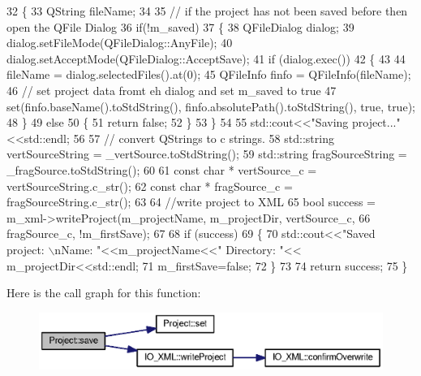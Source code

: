 \begin{DoxyCode}
32 \{
33   QString fileName;
34 
35   \textcolor{comment}{// if the project has not been saved before then open the QFile Dialog}
36   \textcolor{keywordflow}{if}(!m_saved)
37   \{
38     QFileDialog dialog;
39     dialog.setFileMode(QFileDialog::AnyFile);
40     dialog.setAcceptMode(QFileDialog::AcceptSave);
41     \textcolor{keywordflow}{if} (dialog.exec())
42     \{
43 
44       fileName = dialog.selectedFiles().at(0);
45       QFileInfo finfo = QFileInfo(fileName);
46       \textcolor{comment}{// set project data fromt eh dialog and set m\_saved to true}
47       set(finfo.baseName().toStdString(), finfo.absolutePath().toStdString(), \textcolor{keyword}{true}, \textcolor{keyword}{true});
48     \}
49     \textcolor{keywordflow}{else}
50     \{
51       \textcolor{keywordflow}{return} \textcolor{keyword}{false};
52     \}
53   \}
54 
55   std::cout<<\textcolor{stringliteral}{"Saving project..."}<<std::endl;
56 
57   \textcolor{comment}{// convert QStrings to c strings.}
58   std::string vertSourceString = \_vertSource.toStdString();
59   std::string fragSourceString = \_fragSource.toStdString();
60 
61   \textcolor{keyword}{const} \textcolor{keywordtype}{char} * vertSource\_c = vertSourceString.c\_str();
62   \textcolor{keyword}{const} \textcolor{keywordtype}{char} * fragSource\_c = fragSourceString.c\_str();
63 
64   \textcolor{comment}{//write project to XML}
65   \textcolor{keywordtype}{bool} success = m_xml->writeProject(m_projectName, m_projectDir, vertSource\_c,
66                                      fragSource\_c, !m_firstSave);
67 
68   \textcolor{keywordflow}{if} (success)
69   \{
70     std::cout<<\textcolor{stringliteral}{"Saved project: \(\backslash\)nName: "}<<m_projectName<<\textcolor{stringliteral}{"  Directory: "}<<
      m_projectDir<<std::endl;
71     m_firstSave=\textcolor{keyword}{false};
72   \}
73 
74   \textcolor{keywordflow}{return} success;
75 \}
\end{DoxyCode}


Here is the call graph for this function\-:\nopagebreak
\begin{figure}[H]
\begin{center}
\leavevmode
\includegraphics[width=350pt]{class_project_af285ceb406be688b3c81cdd445a159e6_cgraph}
\end{center}
\end{figure}




